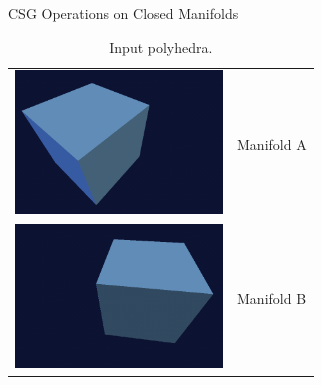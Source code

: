 \documentclass{carve}
\begin{document}
\begin{section}{CSG Operations on Closed Manifolds}
\begin{table}
  \begin{center}
    \begin{tabular}{m{2.2in}m{3in}}
      \includegraphics[width=2.167in]{ops/a.png} & \vfill Manifold A \vfill \\
      \includegraphics[width=2.167in]{ops/b.png} & Manifold B \\
    \end{tabular}
  \end{center}
  \caption{Input polyhedra.}
  \label{tab:input-polyhedra}
\end{table}


\end{section}
\end{document}
